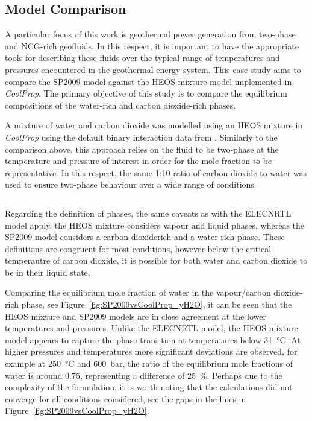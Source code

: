 \subsection{Model Comparison}
\label{sec:tppm_model_comparison}
    A particular focus of this work is geothermal power generation from two-phase and \ac{NCG}-rich geofluids. In this respect, it is important to have the appropriate tools for describing these fluids over the typical range of temperatures and pressures encountered in the geothermal energy system. This case study aims to compare the \ac{SP2009} model against the \ac{HEOS} mixture model implemented in \emph{CoolProp}. The primary objective of this study is to compare the equilibrium compositions of the water-rich and carbon dioxide-rich phases.

    A mixture of water and carbon dioxide was modelled using an \ac{HEOS} mixture in \emph{CoolProp} using the default binary interaction data from \citeauthor{Gernert2013}. Similarly to the comparison above, this approach relies on the fluid to be two-phase at the temperature and pressure of interest in order for the mole fraction to be representative. In this respect, the same 1:10 ratio of carbon dioxide to water was used to ensure two-phase behaviour over a wide range of conditions.

    \inputminted[bgcolor=bg,linenos, fontsize=\footnotesize]{python}{Content/TPPM/CaseStudies/Code/SP2009vsCoolProp.py}

    Regarding the definition of phases, the same caveats as with the ELECNRTL model apply, the \ac{HEOS} mixture considers vapour and liquid phases, whereas the \ac{SP2009} model considers a carbon-dioxiderich and a water-rich phase. These definitions are congruent for most conditions, however below the critical temperautre of carbon dioxide, it is possible for both water and carbon dioxide to be in their liquid state.

    Comparing the equilibrium mole fraction of water in the vapour/carbon dioxide-rich phase, see Figure~\ref{fig:SP2009vsCoolProp_yH2O}, it can be seen that the \ac{HEOS} mixture and \ac{SP2009} models are in close agreement at the lower temperatures and pressures. Unlike the ELECNRTL model, the \ac{HEOS} mixture model appears to capture the phase transition at temperatures below \qty{31}{\degreeCelsius}. At higher pressures and temperatures more significant deviations are observed, for example at \qty{250}{\degreeCelsius} and \qty{600}{\bar}, the ratio of the equilibrium mole fractions of water is around \num{0.75}, representing a difference of \qty{25}{\percent}. Perhaps due to the complexity of the formulation, it is worth noting that the calculations did not converge for all conditions considered, see the gaps in the lines in Figure~\ref{fig:SP2009vsCoolProp_yH2O}.

